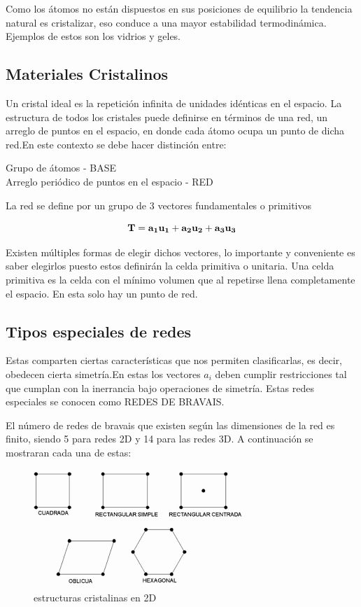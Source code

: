 \documentclass[12pt,a4paper]{article}
\begin{document}
Como los átomos no están dispuestos en sus posiciones de equilibrio la tendencia natural es cristalizar, eso conduce a una mayor estabilidad termodinámica.
Ejemplos de estos son los vidrios y geles.


\subsection{Materiales Cristalinos}

Un cristal ideal es la repetición infinita de unidades idénticas en el espacio. La estructura de todos los cristales puede definirse en términos de una red, un arreglo de puntos en el espacio, en donde cada átomo ocupa un punto de dicha red.En este contexto se debe hacer distinción entre:

\begin{center}
Grupo de átomos - BASE \\
Arreglo periódico de puntos en el espacio  - RED
\end{center}

La red se define por un grupo de 3 vectores fundamentales o primitivos 

\begin{equation*}
    \bf{T} = a_{1} \bf{u_1} + a_{2}\bf{u_2} + a_{3}\bf{u_3}   
\end{equation*}


Existen múltiples formas de elegir dichos vectores, lo importante y conveniente es saber elegirlos puesto estos definirán la celda primitiva o unitaria. Una celda primitiva es la celda con el mínimo volumen que al repetirse llena completamente el espacio. En esta solo hay un punto de red.

\subsection{Tipos especiales de redes}

Estas comparten ciertas características que nos permiten clasificarlas, es decir, obedecen cierta simetría.En estas los vectores \textbf{$a_{i}$} deben cumplir restricciones tal que cumplan con la inerrancia bajo operaciones de simetría. Estas redes especiales se conocen como REDES DE BRAVAIS.

El número de redes de bravais que existen según las dimensiones de la red es finito, siendo 5 para redes 2D y 14 para las redes 3D. A continuación se mostraran cada una de estas: 

 \begin{figure}[H]
    \centering
	\includegraphics[width=0.8\linewidth]{Q.png}
	\caption{estructuras cristalinas en 2D}
\end{figure}
\end{document}

